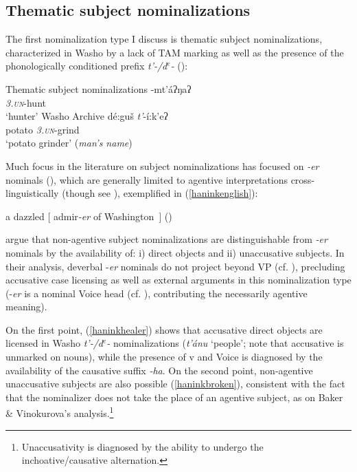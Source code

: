 \documentclass[output=paper]{langscibook}
\begin{document}
\subsection{Thematic subject nominalizations}

The first nominalization type I discuss is thematic subject nominalizations, characterized in Washo by a lack of TAM marking as well as the presence of the phonologically conditioned prefix {\itshape t'-/d$^e$-} (\citealt{jacobsen1964}):

\ea Thematic subject nominalizations
\ea {}-mt'áʔŋaʔ\\
\textit{\textsc{3.un}}-hunt\\
\glt `hunter' \hfill Washo Archive
\ex \gll dé:guš {\itshape t'}-í:k'eʔ\\
potato \textit{\textsc{3.un}}-grind\\
\glt `potato grinder' ({\itshape man's name}) \hfill \citep[354]{jacobsen1964}
\z
\z

Much focus in the literature on subject nominalizations has focused on {\itshape -er} nominals (\citealt{rappaporthovavlevin1992,bakervinokurova2009,alexiadouschafer2010}), which are generally limited to agentive interpretations cross-linguistically (though see \citealt{alexiadouschafer2008,alexiadouschafer2010}), exemplified in (\ref{haninkenglish}):

\ea a dazzled $[$ admir{\itshape -er} of Washington\ $]$  \hfill (\citealt{rappaporthovavlevin1992})\label{haninkenglish}
\z 



\noindent\citet{bakervinokurova2009} argue that non-agentive subject nominalizations are distinguishable from {\itshape -er} nominals by the availability of: i) direct objects and ii) unaccusative subjects. In their analysis, deverbal -{\itshape er} nominals do not project beyond VP (cf. \citealt{alexiadouschafer2010}), precluding accusative case licensing as well as external arguments in this nominalization type  (-{\itshape er} is a nominal Voice head (cf. \citealt{kratzer1996}), contributing the necessarily agentive meaning). 

On the first point, (\ref{haninkhealer}) shows that accusative direct objects are licensed in Washo  {\itshape t'-/d$^e$-} nominalizations ({\itshape t'ánu} `people'; note that accusative is unmarked on nouns), while the presence of v and Voice is diagnosed by the availability of the causative suffix {\itshape -ha}. On the second point, non-agentive unaccusative subjects are also possible (\ref{haninkbroken}), consistent with the fact that the nominalizer does not take the place of an agentive subject, as on Baker \& Vinokurova's \citeyear{bakervinokurova2009} analysis.\footnote{Unaccusativity is diagnosed by the ability to undergo the inchoative/causative alternation.}
\end{document}

